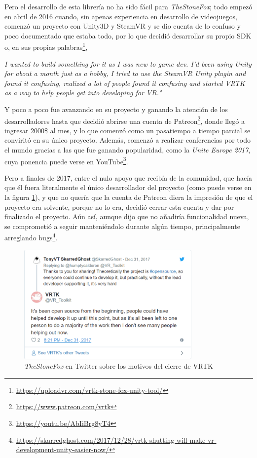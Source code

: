 Pero el desarrollo de esta librería no ha sido fácil para \textit{TheStoneFox}; todo empezó en abril de 2016 cuando, sin apenas experiencia en desarrollo de videojuegos, comenzó un proyecto con Unity3D y SteamVR y se dio cuenta de lo confuso y poco documentado que estaba todo, por lo que decidió desarrollar su propio \acs{SDK} o, en sus propias palabras\footnote{\url{https://uploadvr.com/vrtk-stone-fox-unity-tool/}},

\begin{displayquote}
\textit{I wanted to build something for it as I was new to game dev. I’d been using Unity for about a month just as a hobby, I tried to use the SteamVR Unity plugin and found it confusing, realized a lot of people found it confusing and started VRTK as a way to help people get into developing for VR."}
\end{displayquote}

Y poco a poco fue avanzando en su proyecto y ganando la atención de los desarrolladores hasta que decidió abrirse una cuenta de Patreon\footnote{\url{https://www.patreon.com/vrtk}}, donde llegó a ingresar 2000\$ al mes, y lo que comenzó como un pasatiempo a tiempo parcial se conviritó en su único proyecto. Además, comenzó a realizar conferencias por todo el mundo gracias a las que fue ganando popularidad, como la \textit{Unite Europe 2017}, cuya ponencia puede verse en YouTube\footnote{\url{https://youtu.be/AbIiBrg8yT4}}.

Pero a finales de 2017, entre el nulo apoyo que recibía de la comunidad, que hacía que él fuera literalmente el único desarrollador del proyecto (como puede verse en la figura \ref{fig:stonefox-twitter}), y que no quería que la cuenta de Patreon diera la impresión de que el proyecto era solvente, porque no lo era, decidió cerrar esta cuenta y dar por finalizado el proyecto. Aún así, aunque dijo que no añadiría funcionalidad nueva, se comprometió a seguir manteniéndolo durante algún tiempo, principalmente arreglando bugs\footnote{\url{https://skarredghost.com/2017/12/28/vrtk-shutting-will-make-vr-development-unity-easier-now/}}.

\begin{figure}[!h]
\begin{center}
\includegraphics[width=0.8\textwidth]{imagenes/2/stonefox-twitter.png}
\caption{\textit{TheStoneFox} en Twitter sobre los motivos del cierre de \acs{VRTK}}
\label{fig:stonefox-twitter}
\end{center}
\end{figure}

